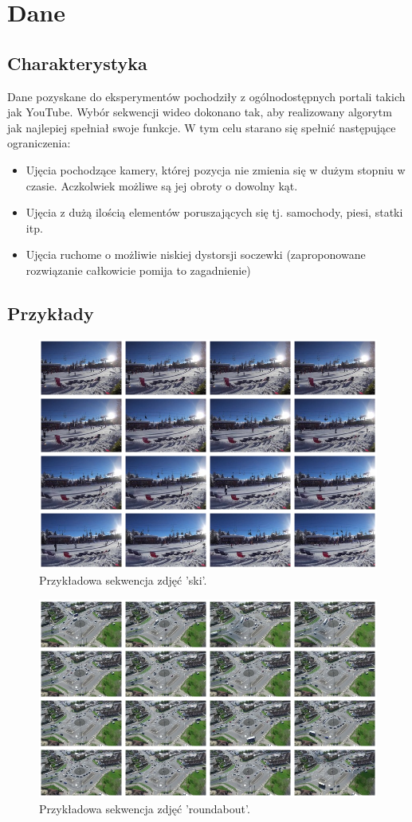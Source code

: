 \chapter{Dane}
\section{Charakterystyka}
Dane pozyskane do eksperymentów pochodziły z ogólnodostępnych portali takich jak YouTube. Wybór sekwencji wideo dokonano tak, aby realizowany algorytm jak najlepiej spełniał swoje funkcje. W tym celu starano się spełnić następujące ograniczenia:
\begin{itemize}
\item Ujęcia pochodzące kamery, której pozycja nie zmienia się w dużym stopniu w czasie. Aczkolwiek możliwe są jej obroty o dowolny kąt.
\item Ujęcia z dużą ilością elementów poruszających się tj. samochody, piesi, statki itp.
\item Ujęcia ruchome o możliwie niskiej dystorsji soczewki (zaproponowane rozwiązanie całkowicie pomija to zagadnienie)
\end{itemize}
\section{Przykłady} \label{samples}

\begin{figure}[H]
	\centering
		\includegraphics[width=0.75\linewidth]{img/ski_cuted_frames_tile.png}
	\caption[Sekwencja zdjęć 'ski'.]{Przykładowa sekwencja zdjęć 'ski'.}
	\label{fig:binary}
\end{figure}

\begin{figure}[H]
	\centering
		\includegraphics[width=0.75\linewidth]{img/roundabout_frames_tile.png}
	\caption[Sekwencja zdjęć 'roundabout'.]{Przykładowa sekwencja zdjęć 'roundabout'.}
	\label{fig:binary}
\end{figure}

